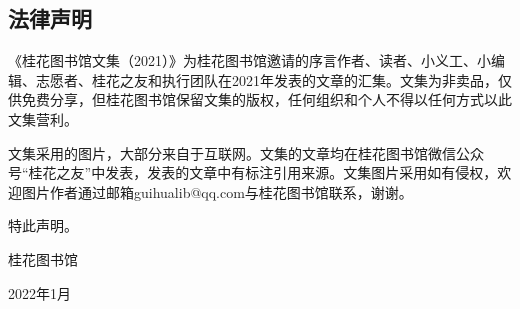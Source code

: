     
    



\vspace{10pt}

\hline



\vspace{10pt}

{\centering\subsection*{法律声明}}


\renewcommand{\leftmark}{法律声明}

《桂花图书馆文集（2021）》为桂花图书馆邀请的序言作者、读者、小义工、小编辑、志愿者、桂花之友和执行团队在2021年发表的文章的汇集。文集为非卖品，仅供免费分享，但桂花图书馆保留文集的版权，任何组织和个人不得以任何方式以此文集营利。


文集采用的图片，大部分来自于互联网。文集的文章均在桂花图书馆微信公众号“桂花之友”中发表，发表的文章中有标注引用来源。文集图片采用如有侵权，欢迎图片作者通过邮箱guihualib@qq.com与桂花图书馆联系，谢谢。


特此声明。
\vspace{10pt}

桂花图书馆


2022年1月


\vspace{10pt}

\hline



\clearpage